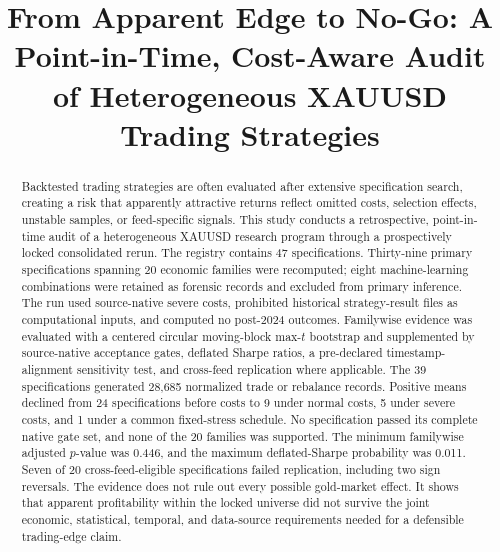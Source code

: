 \documentclass[a4paper,fleqn]{cas-sc}
\begin{document}
\let\WriteBookmarks\relax
\def\floatpagepagefraction{.8}
\def\textpagefraction{.1}

\shortauthors{\AuthorShortName}

\title[mode=title]{From Apparent Edge to No-Go: A Point-in-Time, Cost-Aware Audit of Heterogeneous XAUUSD Trading Strategies}

\author[1]{\AuthorName}
\cormark[1]



\begin{abstract}
Backtested trading strategies are often evaluated after extensive specification search, creating a risk that apparently attractive returns reflect omitted costs, selection effects, unstable samples, or feed-specific signals. This study conducts a retrospective, point-in-time audit of a heterogeneous XAUUSD research program through a prospectively locked consolidated rerun. The registry contains 47 specifications. Thirty-nine primary specifications spanning 20 economic families were recomputed; eight machine-learning combinations were retained as forensic records and excluded from primary inference. The run used source-native severe costs, prohibited historical strategy-result files as computational inputs, and computed no post-2024 outcomes. Familywise evidence was evaluated with a centered circular moving-block max-$t$ bootstrap and supplemented by source-native acceptance gates, deflated Sharpe ratios, a pre-declared timestamp-alignment sensitivity test, and cross-feed replication where applicable. The 39 specifications generated 28,685 normalized trade or rebalance records. Positive means declined from 24 specifications before costs to 9 under normal costs, 5 under severe costs, and 1 under a common fixed-stress schedule. No specification passed its complete native gate set, and none of the 20 families was supported. The minimum familywise adjusted $p$-value was 0.446, and the maximum deflated-Sharpe probability was 0.011. Seven of 20 cross-feed-eligible specifications failed replication, including two sign reversals. The evidence does not rule out every possible gold-market effect. It shows that apparent profitability within the locked universe did not survive the joint economic, statistical, temporal, and data-source requirements needed for a defensible trading-edge claim.
\end{abstract}
\end{document}
